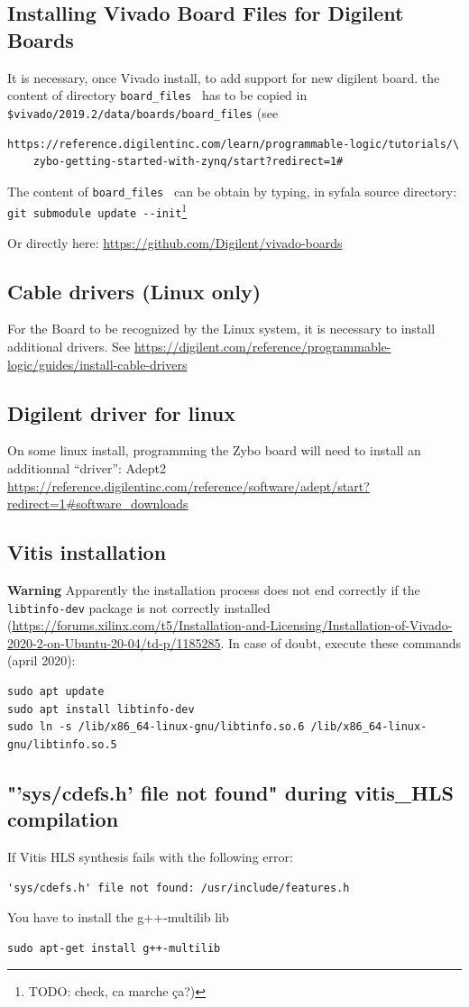 \documentclass[11pt]{article}
\numberwithin{equation}{section}
\numberwithin{figure}{section}
\begin{document}
\subsection{Installing Vivado Board Files for Digilent Boards}
It is necessary, once Vivado install, to add support for new digilent board.
the content of directory {\tt board\_files } has to be copied in \verb#$vivado/2019.2/data/boards/board_files#
(see \begin{verbatim}https://reference.digilentinc.com/learn/programmable-logic/tutorials/\ 
    zybo-getting-started-with-zynq/start?redirect=1#
\end{verbatim}
The content of {\tt board\_files } can be obtain by typing, in syfala source directory:     \verb#git submodule update --init#\footnote{TODO: check, ca marche ça?)}

Or directly here: \url{https://github.com/Digilent/vivado-boards}

\subsection{Cable drivers (Linux only)}
For the Board to be recognized by the Linux system, it is necessary to install additional drivers. See \url{https://digilent.com/reference/programmable-logic/guides/install-cable-drivers}


\subsection{Digilent driver for linux}
On some linux install, programming the Zybo board will need to install an additionnal ``driver'': Adept2 \url{https://reference.digilentinc.com/reference/software/adept/start?redirect=1#software_downloads}

\subsection{Vitis installation}
{\bf Warning} Apparently the installation process does not end correctly if the {\tt libtinfo-dev} package is not correctly installed (\url{https://forums.xilinx.com/t5/Installation-and-Licensing/Installation-of-Vivado-2020-2-on-Ubuntu-20-04/td-p/1185285}. In case of doubt, execute these commands (april 2020):
\begin{verbatim}
sudo apt update
sudo apt install libtinfo-dev
sudo ln -s /lib/x86_64-linux-gnu/libtinfo.so.6 /lib/x86_64-linux-gnu/libtinfo.so.5
\end{verbatim}

\subsection{"'sys/cdefs.h' file not found" during vitis\_HLS compilation}
If Vitis HLS synthesis fails with the following error:
\begin{verbatim}
'sys/cdefs.h' file not found: /usr/include/features.h 
\end{verbatim}
You have to install the g++-multilib lib
\begin{verbatim}
sudo apt-get install g++-multilib
\end{verbatim}
\end{document}
